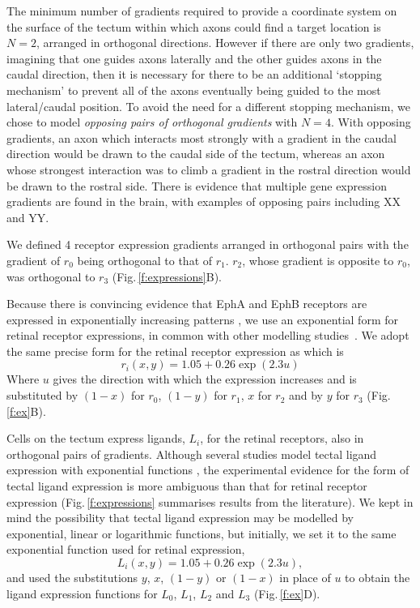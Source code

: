 \documentclass[11pt, a4paper, draft]{article}
\begin{document}
The minimum number of gradients required to provide a coordinate system on the
surface of the tectum within which axons could find a target location is
$N=2$, arranged in orthogonal directions. However if there are only two
gradients, imagining that one guides axons laterally and the other guides
axons in the caudal direction, then it is necessary for there to be an
additional `stopping mechanism' to prevent all of the axons eventually being
guided to the most lateral/caudal position. To avoid the need for a different
stopping mechanism, we chose to model \emph{opposing pairs of orthogonal
gradients} with $N=4$. With opposing gradients, an axon which interacts most
strongly with a gradient in the caudal direction would be drawn to the caudal
side of the tectum, whereas an axon whose strongest interaction was to climb a
gradient in the rostral direction would be drawn to the rostral side. There is
evidence that multiple gene expression gradients are found in the brain, with
examples of opposing pairs including XX and YY.

We defined 4 receptor expression gradients arranged in orthogonal pairs
with the gradient of $r_0$ being orthogonal to that of $r_1$. $r_2$, whose
gradient is opposite to $r_0$, was orthogonal to $r_3$ (Fig.\,\ref{f:expressions}B).

Because there is convincing evidence that EphA and EphB receptors are
expressed in exponentially increasing
patterns \citep{reber_relative_2004,feldheim_genetic_2000,brown_topographic_2000,koulakov_stochastic_2004},
we use an exponential form for retinal receptor expressions, in common with
other modelling
studies~\citep{reber_relative_2004,koulakov_stochastic_2004,simpson_simple_2011}.
We adopt the same precise form for the retinal receptor expression
as \citet{simpson_simple_2011} which is
\begin{equation} \label{e:retrcpt}
r_i(x,y) = 1.05 + 0.26 \exp(2.3 u)
\end{equation}
Where $u$ gives the direction with which the expression increases and is
substituted by $(1-x)$ for $r_0$, $(1-y)$ for $r_1$, $x$ for $r_2$ and by $y$ for
$r_3$ (Fig.\,\ref{f:ex}B).

Cells on the tectum express ligands, $L_i$, for the retinal receptors, also in
orthogonal pairs of gradients. Although several studies model tectal ligand
expression with exponential functions \citep{koulakov_stochastic_2004}, the
experimental evidence for the form of tectal ligand expression is more ambiguous than that for
retinal receptor expression (Fig.\,\ref{f:expressions} summarises results from
the literature). We kept in mind the
possibility that tectal ligand expression may be modelled by exponential,
linear or logarithmic functions, but initially, we set it to the same
exponential function used for retinal expression,
\begin{equation} \label{e:tecligexp}
L_i(x,y) = 1.05 + 0.26 \exp(2.3 u),
\end{equation}
and used the substitutions $y$, $x$, $(1-y)$ or $(1-x)$ in place of $u$ to obtain
the ligand expression functions for $L_0$, $L_1$, $L_2$ and $L_3$
(Fig.\,\ref{f:ex}D).
\end{document}
